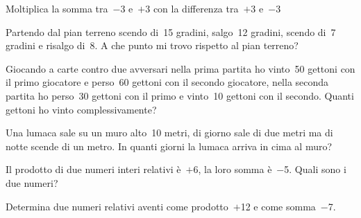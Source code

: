 \begin{multicols}{2}
\begin{esercizio}
 Moltiplica la somma tra~\(-3\) e~\(+3\) con la differenza tra~\(+3\) e~\(-3\)
\end{esercizio}

\begin{esercizio}
 Partendo dal pian terreno scendo di~15 gradini, salgo~12 gradini, scendo di~7
gradini e risalgo di~8. A che punto mi trovo rispetto al pian terreno?
\end{esercizio}

\begin{esercizio}
 Giocando a carte contro due avversari nella prima partita ho vinto~50 gettoni 
con il primo giocatore e perso~60
gettoni con il secondo giocatore, nella seconda partita ho perso~30 gettoni con 
il primo e vinto~10 gettoni
con il secondo. Quanti gettoni ho vinto complessivamente?
\end{esercizio}


\begin{esercizio}
 Una lumaca sale su un muro alto~10 metri, di giorno sale di due metri ma di 
notte
scende di un metro. In quanti giorni la lumaca arriva in cima al muro?
\end{esercizio}

% 

\begin{esercizio}
 Il prodotto di due numeri interi relativi è~\(+6\), la loro somma è~\(-\)5. Quali 
sono i due numeri?
\end{esercizio}


\begin{esercizio}
 Determina due numeri relativi aventi come prodotto~\(+\)12 e come somma~\(-\)7.
\end{esercizio}


\end{multicols}
